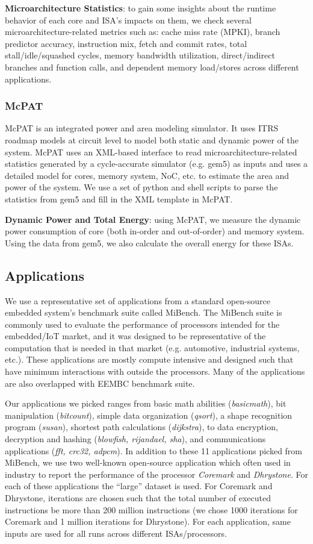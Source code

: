 \noindent \textbf{Microarchitecture Statistics}: to gain some insights about the runtime behavior of each core and ISA's impacts on them, we check several microarchitecture-related metrics such as: cache miss rate (MPKI), branch predictor accuracy, instruction mix, fetch and commit rates, total stall/idle/squashed cycles, memory bandwidth utilization, direct/indirect branches and function calls, and dependent memory load/stores across different applications. 

\subsubsection{McPAT}
McPAT is an integrated power and area modeling simulator. It uses ITRS roadmap models at circuit level to model both static and dynamic power of the system. McPAT uses an XML-based interface to read microarchitecture-related statistics generated by a cycle-accurate simulator (e.g. gem5) as inputs and uses a detailed model for cores, memory system, NoC, etc. to estimate the area and power of the system. We use a set of python and shell scripts to parse the statistics from gem5 and fill in the XML template in McPAT.  

\noindent \textbf{Dynamic Power and Total Energy}: using McPAT, we measure the dynamic power consumption of core (both in-order and out-of-order) and memory system. Using the data from gem5, we also calculate the overall energy for these ISAs.

\subsection{Applications}
We use a representative set of applications from a standard open-source embedded system's benchmark suite called MiBench. The MiBench suite is commonly used to evaluate the performance of processors intended for the embedded/IoT market, and it was designed to be representative of the computation that is needed in that market (e.g. automotive, industrial systems, etc.). These applications are mostly compute intensive and designed such that have minimum interactions with outside the processors. Many of the applications are also overlapped with EEMBC benchmark suite. 

Our applications we picked ranges from basic math abilities (\textit{basicmath}), bit manipulation (\textit{bitcount}), simple data organization (\textit{qsort}), a shape recognition program (\textit{susan}), shortest path calculations (\textit{dijkstra}), to data encryption, decryption and hashing (\textit{blowfish, rijandael, sha}), and communications applications (\textit{fft, crc32, adpcm}). In addition to these 11 applications picked from MiBench, we use two well-known open-source application which often used in industry to report the performance of the processor \textit{Coremark} and \textit{Dhrystone}. For each of these applications the ``large'' dataset is used. For Coremark and Dhrystone, iterations are chosen such that the total number of executed instructions be more than 200 million instructions (we chose 1000 iterations for Coremark and 1 million iterations for Dhrystone). For each application, same inputs are used for all runs across different ISAs/processors. 

   
 

